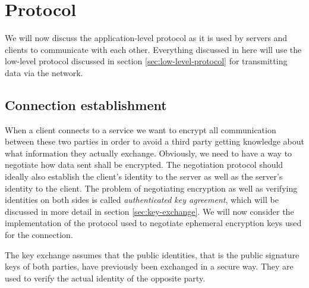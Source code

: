 \section{Protocol}
\label{sec:protocol}

We will now discuss the application-level protocol as it is used by servers and clients to communicate with each other.
Everything discussed in here will use the low-level protocol discussed in section \ref{sec:low-level-protocol} for transmitting data via the network.

\subsection{Connection establishment}
\label{sec:connection-establishment}

When a client connects to a service we want to encrypt all communication between these two parties in order to avoid a third party getting knowledge about what information they actually exchange.
Obviously, we need to have a way to negotiate how data sent shall be encrypted.
The negotiation protocol should ideally also establish the client's identity to the server as well as the server's identity to the client.
The problem of negotiating encryption as well as verifying identities on both sides is called \emph{authenticated key agreement}, which will be discussed in more detail in section \ref{sec:key-exchange}.
We will now consider the implementation of the protocol used to negotiate ephemeral encryption keys used for the connection.

The key exchange assumes that the public identities, that is the public signature keys of both parties, have previously been exchanged in a secure way.
They are used to verify the actual identity of the opposite party.

